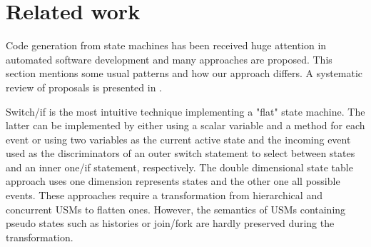 \section{Related work}
\label{sec:relatedwork}
Code generation from state machines has been received huge attention in automated software development and many approaches are proposed. 
This section mentions some usual patterns and how our approach differs. 
A systematic review of proposals is presented in \cite{Domnguez2012}. 


Switch/if is the most intuitive technique implementing a "flat" state machine. The latter can be implemented by either
using a scalar variable \cite{Booch1998} and a method for each event or using two variables as the current active state and the incoming event used as the discriminators of an outer switch statement to select between states and an inner one/if statement, respectively. 
The double dimensional state table approach \cite{Douglass1999} uses one dimension represents states and the other one all possible events. 
These approaches require a transformation from hierarchical and concurrent USMs to flatten ones. 
However, the semantics of USMs containing pseudo states such as histories or join/fork are hardly preserved during the transformation.  

